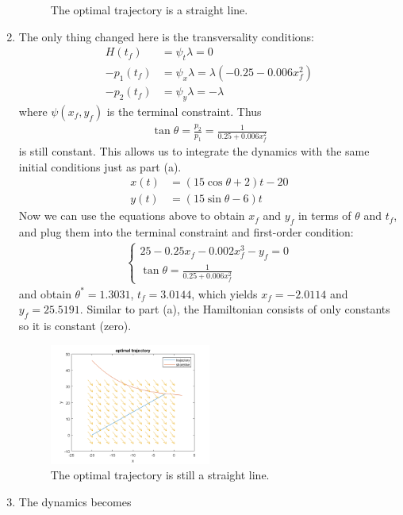 \documentclass[12pt]{article}
\begin{document}
\begin{problem}[4]
\begin{enumerate}[label=(\alph*)]
\begin{figure}[H]
	\caption{The optimal trajectory is a straight line.}
\end{figure}
\item The only thing changed here is the transversality conditions:
\begin{align*}
	H(t_f) &= \psi_t \lambda = 0 \\
	-p_1(t_f)  &= \psi_x \lambda =\lambda(-0.25-0.006 x_f^2) \\
	-p_2(t_f) &= \psi_y \lambda = -\lambda 
\end{align*}
where $ \psi(x_f,y_f)$ is the terminal constraint. Thus
 \begin{align*}
	\tan \theta = \frac{p_2}{ p_1} = \frac{1}{0.25+0.006 x_f^2}
\end{align*}
is still constant. This allows us to integrate the dynamics with the same initial conditions just as part (a).
\begin{align*}
	x(t) &= (15 \cos \theta+2) t -20\\
	y(t) &= (15 \sin \theta - 6) t  
\end{align*}
Now we can use the equations above to obtain $ x_f$ and  $ y_f$ in terms of  $ \theta$ and $ t_f$, and plug them into the terminal constraint and first-order condition:
 \begin{align*}
\begin{cases}
	25-0.25x_f - 0.002x_f^3-y_f = 0 \\
\tan \theta = \frac{1}{0.25+0.006x_f^2} 
\end{cases}
\end{align*}
and obtain $ \theta^*  = 1.3031 $, $ t_f =3.0144$, which yields $ x_f=-2.0114$ and  $ y_f = 25.5191$. Similar to part (a), the Hamiltonian consists of only constants so it is constant (zero).
~\begin{figure}[H]
	\centering
	\includegraphics[width=0.5\textwidth]{./figures/5.4b.png}
	\caption{The optimal trajectory is still a straight line.}
\end{figure}
\item The dynamics becomes

\end{enumerate}
\end{problem}
\end{document}
